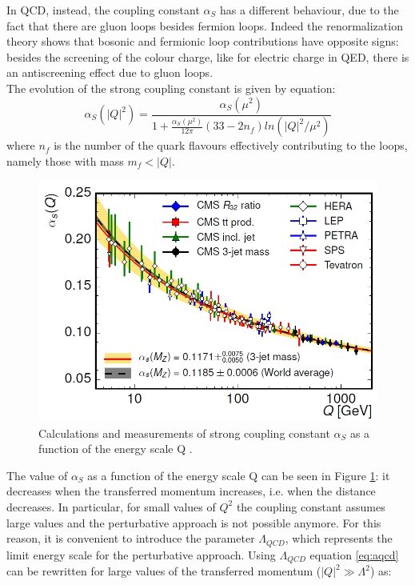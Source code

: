 %
In QCD, instead, the coupling constant $\alpha_{S}$ has a different behaviour, due to the fact that there are gluon loops besides fermion loops. Indeed the renormalization theory shows that bosonic and fermionic loop contributions have opposite signs: besides the screening of the colour charge, like for electric charge in QED, there is an antiscreening effect due to gluon loops.\\
The evolution of the strong coupling constant is given by equation:
%
\begin{equation}
 \alpha_{S}(|Q|^{2})= \frac{ \alpha_{S}(\mu^{2})}{1+\frac{\alpha_{S}(\mu^{2})}{12\pi}(33-2n_{f})ln(|Q|^{2} / \mu^{2})}
 \label{eq:aqcd}
\end{equation}
%
where $n_{f}$ is the number of the quark flavours effectively contributing to the loops, namely those with mass $m_{f} < |Q|$.
%
\begin{figure}
  \centering
  \includegraphics[scale=0.30]{figures/alphas_3j.jpg}
  \caption{Calculations and measurements of strong coupling constant $\alpha_{S}$ as a function of the energy scale Q \cite{kh2015}.}
  \label{fig:alphas}
\end{figure}
%
The value of $\alpha_{S}$ as a function of the energy scale Q can be seen in Figure \ref{fig:alphas}: it decreases when the transferred momentum increases, i.e. when the distance decreases. In particular, for small values of $Q^{2}$ the coupling constant assumes large values and the perturbative approach is not possible anymore.
For this reason, it is convenient to introduce the parameter $\Lambda_{QCD}$, which represents the limit energy scale for the perturbative approach. Using $\Lambda_{QCD}$ equation \ref{eq:aqcd} can be rewritten for large values of the transferred momentum ($|Q|^{2} \gg \Lambda^{2}$) as:
